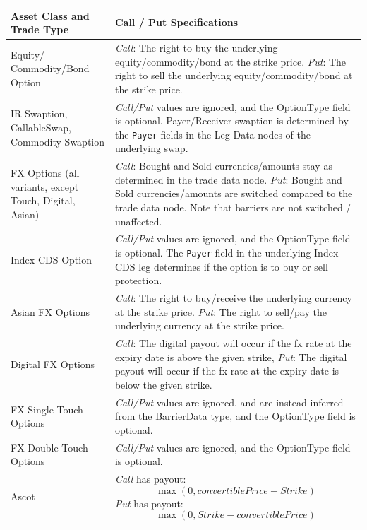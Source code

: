 \begin{itemize}
\begin{table}[H]
\centering
\begin{tabular} {|p{6cm}|p{8cm}|}
    \hline
      \bfseries{Asset Class and Trade Type}  & \bfseries{Call / Put Specifications} \\  \hline
Equity/ Commodity/Bond Option & \emph{Call}: The right to buy the underlying equity/commodity/bond at the strike price.
\newline \emph{Put}: The right to sell the underlying equity/commodity/bond at the strike price. \\  \hline
 IR Swaption, CallableSwap, Commodity Swaption&  \emph{Call/Put} values are ignored, and the OptionType field is optional. Payer/Receiver swaption is determined by the  \lstinline!Payer! fields in the Leg Data nodes of the underlying swap. \\ \hline
FX Options (all variants, except Touch, Digital, Asian) &  \emph{Call}: Bought and Sold currencies/amounts stay as determined in the trade data node.
\newline \emph{Put}: Bought and Sold currencies/amounts are switched compared to the trade data node. Note that barriers are not switched / unaffected. \\ \hline
Index CDS Option &  \emph{Call/Put} values are ignored, and the OptionType field is optional. The \lstinline!Payer! field in the underlying Index CDS leg  determines if the option is to buy or sell protection. \\ \hline
Asian FX Options &  \emph{Call}: The right to buy/receive the underlying currency at the strike price.  \newline \emph{Put}: The right to sell/pay  the underlying currency at the strike price.   \\ \hline
Digital FX Options &  \emph{Call}: The digital payout will occur if the fx rate at the expiry date is above the given
strike, \newline \emph{Put}: The digital payout will occur if the fx rate at the expiry date is below the given strike.   \\ \hline
FX Single Touch Options &  \emph{Call/Put} values are ignored, and are instead inferred from the BarrierData type, and the OptionType field is optional.   \\ \hline
FX Double Touch Options &  \emph{Call/Put} values are ignored, and the OptionType field is optional.  \\ \hline
Ascot &  \emph{Call} has payout: $$ \max(0, convertiblePrice - Strike) $$ \emph{Put} has payout: $$ \max(0, Strike - convertiblePrice) $$  \\ \hline


\end{tabular}
\end{table}
\end{itemize}
